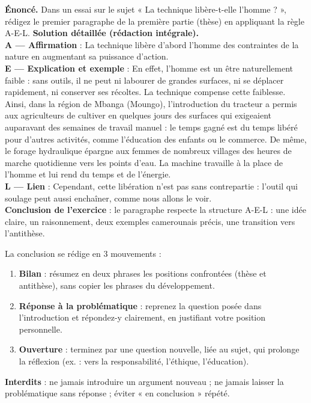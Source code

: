 \documentclass[11pt]{article}
\begin{document}
\begin{exoresolu}
\textbf{Énoncé.} Dans un essai sur le sujet « La technique libère-t-elle l'homme ? », rédigez le premier paragraphe de la première partie (thèse) en appliquant la règle A-E-L.
\tcblower
\textbf{Solution détaillée (rédaction intégrale).}\\
\textbf{A — Affirmation} : La technique libère d'abord l'homme des contraintes de la nature en augmentant sa puissance d'action.\\
\textbf{E — Explication et exemple} : En effet, l'homme est un être naturellement faible : sans outils, il ne peut ni labourer de grandes surfaces, ni se déplacer rapidement, ni conserver ses récoltes. La technique compense cette faiblesse. Ainsi, dans la région de Mbanga (Moungo), l'introduction du tracteur a permis aux agriculteurs de cultiver en quelques jours des surfaces qui exigeaient auparavant des semaines de travail manuel : le temps gagné est du temps libéré pour d'autres activités, comme l'éducation des enfants ou le commerce. De même, le forage hydraulique épargne aux femmes de nombreux villages des heures de marche quotidienne vers les points d'eau. La machine travaille à la place de l'homme et lui rend du temps et de l'énergie.\\
\textbf{L — Lien} : Cependant, cette libération n'est pas sans contrepartie : l'outil qui soulage peut aussi enchaîner, comme nous allons le voir.\\
\textbf{Conclusion de l'exercice} : le paragraphe respecte la structure A-E-L : une idée claire, un raisonnement, deux exemples camerounais précis, une transition vers l'antithèse.
\end{exoresolu}

\begin{methode}
La conclusion se rédige en 3 mouvements :
\begin{enumerate}
\item \textbf{Bilan} : résumez en deux phrases les positions confrontées (thèse et antithèse), sans copier les phrases du développement.
\item \textbf{Réponse à la problématique} : reprenez la question posée dans l'introduction et répondez-y clairement, en justifiant votre position personnelle.
\item \textbf{Ouverture} : terminez par une question nouvelle, liée au sujet, qui prolonge la réflexion (ex. : vers la responsabilité, l'éthique, l'éducation).
\end{enumerate}
\textbf{Interdits} : ne jamais introduire un argument nouveau ; ne jamais laisser la problématique sans réponse ; éviter « en conclusion » répété.
\end{methode}
\end{document}
